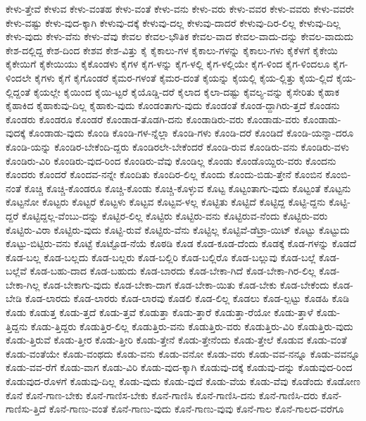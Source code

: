 {ಕೇಳು-ತ್ತೇವೆ
ಕೇಳುವ
ಕೇಳು-ವಂತಹ
ಕೇಳು-ವಂತೆ
ಕೇಳು-ವನು
ಕೇಳು-ವರು
ಕೇಳು-ವವರ
ಕೇಳು-ವವರು
ಕೇಳು-ವವರೇ
ಕೇಳು-ವಷ್ಟು
ಕೇಳು-ವುದ-ಕ್ಕಾಗಿ
ಕೇಳುವು-ದಕ್ಕೆ
ಕೇಳುವು-ದಲ್ಲ
ಕೇಳುವು-ದಾದರೆ
ಕೇಳುವು-ದಿರ-ಲಿಲ್ಲ
ಕೇಳುವು-ದಿಲ್ಲ
ಕೇಳು-ವುದು
ಕೇಳು-ವೆನು
ಕೇಳು-ವೆವು
ಕೇವಲ
ಕೇವಲ-ಭೌತಿಕ
ಕೇವಲ-ವಾದ
ಕೇವಲ-ವಾದು-ದನ್ನು
ಕೇವಲ-ವಾದುದು
ಕೇಶ-ದಲ್ಲಿದ್ದ
ಕೇಶ-ದಿಂದ
ಕೇಶವ
ಕೇಶ-ವಿತ್ತು
ಕೈ
ಕೈಕಾಲು-ಗಳ
ಕೈಕಾಲು-ಗಳನ್ನು
ಕೈಕಾಲು-ಗಳು
ಕೈಕೆಳಗೆ
ಕೈಕೇಯಿ
ಕೈಕೇಯಿಗೆ
ಕೈಕೇಯಿಯು
ಕೈಕೊಂಡಳು
ಕೈಗಳ
ಕೈಗ-ಳನ್ನು
ಕೈಗ-ಳಲ್ಲಿ
ಕೈಗ-ಳಲ್ಲಿಯೇ
ಕೈಗ-ಳಿಂದ
ಕೈಗ-ಳಿಂದಲೂ
ಕೈಗ-ಳಿಂದಲೇ
ಕೈಗಳು
ಕೈಗೆ
ಕೈಗೊಂಡರೆ
ಕೈಮರ-ಗಳಂತೆ
ಕೈಮರ-ದಂತೆ
ಕೈಯನ್ನು
ಕೈಯಲ್ಲಿ
ಕೈಯ-ಲ್ಲಿತ್ತು
ಕೈಯ-ಲ್ಲಿದೆ
ಕೈಯ-ಲ್ಲಿದ್ದಂತೆ
ಕೈಯಲ್ಲೇ
ಕೈಯಿಂದ
ಕೈಯಿ-ಟ್ಟರೆ
ಕೈಯೊಡ್ಡಿ-ದರೆ
ಕೈಲಾದ
ಕೈಲಾ-ದಷ್ಟು
ಕೈವಲ್ಯ-ವನ್ನು
ಕೈಸೇರಿತು
ಕೈಹಾಕ
ಕೈಹಾಕಿದ
ಕೈಹಾಕುವು-ದಿಲ್ಲ
ಕೈಹಾಕು-ವುದು
ಕೊಂಡಂತಾಗು-ವುದು
ಕೊಂಡಂತೆ
ಕೊಂಡ-ದ್ದಾಗಿರು-ತ್ತದೆ
ಕೊಂಡನು
ಕೊಂಡರು
ಕೊಂಡರೂ
ಕೊಂಡರೆ
ಕೊಂಡಾಡ-ತೊಡಗಿ-ದನು
ಕೊಂಡಾಡಿರು-ವರು
ಕೊಂಡಾಡು-ವರು
ಕೊಂಡಾಡು-ವುದಕ್ಕೆ
ಕೊಂಡಾಡು-ವುದು
ಕೊಂಡಿ
ಕೊಂಡಿ-ಗಳ-ನ್ನೆಲ್ಲಾ
ಕೊಂಡಿ-ಗಳು
ಕೊಂಡಿ-ದರೆ
ಕೊಂಡಿದೆ
ಕೊಂಡಿ-ಯನ್ನಾ-ದರೂ
ಕೊಂಡಿ-ಯನ್ನು
ಕೊಂಡಿರ-ಬೇಕೆಂದಿ-ದ್ದರು
ಕೊಂಡಿರಲೇ-ಬೇಕೆಂದರೆ
ಕೊಂಡಿ-ರುವ
ಕೊಂಡಿರು-ವನು
ಕೊಂಡಿರು-ವಳು
ಕೊಂಡಿರು-ವಿರಿ
ಕೊಂಡಿರು-ವುದ-ರಿಂದ
ಕೊಂಡಿರು-ವೆವು
ಕೊಂಡಿಲ್ಲ
ಕೊಂಡು
ಕೊಂಡೊಯ್ದಿರು-ವರು
ಕೊಂದನು
ಕೊಂದರು
ಕೊಂದರೆ
ಕೊಂದವ-ನನ್ನೇ
ಕೊಂದಿತು
ಕೊಂದಿರ-ಲಿಲ್ಲ
ಕೊಂದು
ಕೊಂದು-ಬಿಡು-ತ್ತೇನೆ
ಕೊಂಬಿನ
ಕೊಂಬಿ-ನಂತೆ
ಕೊಚ್ಚಿ
ಕೊಚ್ಚಿ-ಕೊಂಡರೂ
ಕೊಚ್ಚಿ-ಕೊಂಡು
ಕೊಚ್ಚಿ-ಕೊಳ್ಳುವ
ಕೊಟ್ಟ
ಕೊಟ್ಟಂತಾಗು-ವುದು
ಕೊಟ್ಟಂತೆ
ಕೊಟ್ಟನು
ಕೊಟ್ಟನೋ
ಕೊಟ್ಟರು
ಕೊಟ್ಟರೆ
ಕೊಟ್ಟಳು
ಕೊಟ್ಟವ
ಕೊಟ್ಟವ-ಳಲ್ಲ
ಕೊಟ್ಟಿತು
ಕೊಟ್ಟಿದೆ
ಕೊಟ್ಟಿದ್ದ
ಕೊಟ್ಟಿ-ದ್ದನು
ಕೊಟ್ಟಿ-ದ್ದರೆ
ಕೊಟ್ಟಿದ್ದಲ್ಲ-ವೆಂಬು-ದನ್ನು
ಕೊಟ್ಟಿರ-ಲಿಲ್ಲ
ಕೊಟ್ಟಿರು
ಕೊಟ್ಟಿರು-ವನು
ಕೊಟ್ಟಿರುವ-ನೆಂದು
ಕೊಟ್ಟಿರು-ವರು
ಕೊಟ್ಟಿರು-ವಿರಾ
ಕೊಟ್ಟಿರು-ವುದು
ಕೊಟ್ಟಿ-ರುವೆ
ಕೊಟ್ಟಿರು-ವೆನು
ಕೊಟ್ಟಿಲ್ಲ
ಕೊಟ್ಟಿವೆ-ಡೆಟ್ರಾ-ಯಿಟ್
ಕೊಟ್ಟು
ಕೊಟ್ಟುದು
ಕೊಟ್ಟು-ಬಿಟ್ಟಿರು-ವನು
ಕೊಟ್ಟೆ
ಕೊಟ್ಟೊಡ-ನೆಯೆ
ಕೊಠಡಿ
ಕೊಡ
ಕೊಡ-ಕೂಡ-ದೆಂದು
ಕೊಡಕ್ಕೆ
ಕೊಡ-ಗಳನ್ನು
ಕೊಡದೆ
ಕೊಡ-ಬಲ್ಲ
ಕೊಡ-ಬಲ್ಲದು
ಕೊಡ-ಬಲ್ಲರು
ಕೊಡ-ಬಲ್ಲಿರಿ
ಕೊಡ-ಬಲ್ಲಿರೊ
ಕೊಡ-ಬಲ್ಲುವು
ಕೊಡ-ಬಲ್ಲೆ
ಕೊಡ-ಬಲ್ಲೆವೆ
ಕೊಡ-ಬಹು-ದಾದ
ಕೊಡ-ಬಹುದು
ಕೊಡ-ಬಾರದು
ಕೊಡ-ಬೇಕಾ-ಗಿದೆ
ಕೊಡ-ಬೇಕಾ-ಗಿರ-ಲಿಲ್ಲ
ಕೊಡ-ಬೇಕಾ-ಗಿಲ್ಲ
ಕೊಡ-ಬೇಕಾಗು-ವುದು
ಕೊಡ-ಬೇಕಾ-ದಾಗ
ಕೊಡ-ಬೇಕಾ-ಯಿತು
ಕೊಡ-ಬೇಕು
ಕೊಡ-ಬೇಕೆಂದು
ಕೊಡ-ಬೇಡಿ
ಕೊಡ-ಲಾರದು
ಕೊಡ-ಲಾರರು
ಕೊಡ-ಲಾರವು
ಕೊಡಲಿ
ಕೊಡ-ಲಿಲ್ಲ
ಕೊಡಲು
ಕೊಡ-ಲ್ಪಟ್ಟು
ಕೊಡಹಿ
ಕೊಡಿ
ಕೊಡು
ಕೊಡುತ್ತ
ಕೊಡು-ತ್ತದೆ
ಕೊಡು-ತ್ತವೆ
ಕೊಡುತ್ತಾ
ಕೊಡು-ತ್ತಾರೆ
ಕೊಡುತ್ತಾ-ರೆಯೋ
ಕೊಡು-ತ್ತಾಳೆ
ಕೊಡು-ತ್ತಿದ್ದನು
ಕೊಡು-ತ್ತಿದ್ದರು
ಕೊಡುತ್ತಿರ-ಲಿಲ್ಲ
ಕೊಡುತ್ತಿರು-ವನು
ಕೊಡುತ್ತಿರು-ವರು
ಕೊಡುತ್ತಿರು-ವಿರಿ
ಕೊಡುತ್ತಿರು-ವುದು
ಕೊಡು-ತ್ತಿರುವೆ
ಕೊಡು-ತ್ತೀರ
ಕೊಡು-ತ್ತೀರಿ
ಕೊಡು-ತ್ತೇನೆ
ಕೊಡು-ತ್ತೇನೆಂದು
ಕೊಡು-ತ್ತೇಲೆ
ಕೊಡುವ
ಕೊಡು-ವಂತೆ
ಕೊಡು-ವಂತೆಯೇ
ಕೊಡು-ವಂಥದು
ಕೊಡು-ವನು
ಕೊಡು-ವನೋ
ಕೊಡು-ವರು
ಕೊಡು-ವವ-ನನ್ನೂ
ಕೊಡು-ವವನ್ನೂ
ಕೊಡು-ವವ-ರೆಗೆ
ಕೊಡು-ವಾಗ
ಕೊಡು-ವಿರಿ
ಕೊಡು-ವುದ-ಕ್ಕಾಗಿ
ಕೊಡುವು-ದಕ್ಕೆ
ಕೊಡುವು-ದನ್ನು
ಕೊಡುವುದ-ರಿಂದ
ಕೊಡುವುದ-ರೊಳಗೆ
ಕೊಡುವು-ದಿಲ್ಲ
ಕೊಡು-ವುದು
ಕೊಡು-ವುದೆ
ಕೊಡು-ವೆಯ
ಕೊಡು-ವೆವು
ಕೊಡೆಂದು
ಕೊಡೋಣ
ಕೊನೆ
ಕೊನೆ-ಗಾಣ-ಬೇಕು
ಕೊನೆ-ಗಾಣಿಸ-ಬೇಕು
ಕೊನೆ-ಗಾಣಿಸಿ
ಕೊನೆ-ಗಾಣಿಸಿ-ದನು
ಕೊನೆ-ಗಾಣಿಸಿ-ದರು
ಕೊನೆ-ಗಾಣಿಸು-ತ್ತಿದೆ
ಕೊನೆ-ಗಾಣು-ವಂತೆ
ಕೊನೆ-ಗಾಣು-ವುದು
ಕೊನೆ-ಗಾಣು-ವುವು
ಕೊನೆ-ಗಾಲ
ಕೊನೆ-ಗಾಲದ-ವರೆಗೂ
}
